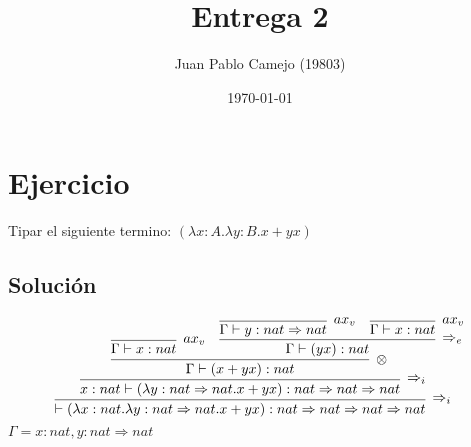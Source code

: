 \documentclass[a4paper,10pt]{article} %
\title{Entrega 2}
\author{Juan Pablo Camejo (19803)}
\date{\today}  %
\begin{document}
\maketitle   %

\section*{Ejercicio}
Tipar el siguiente termino: $(\lambda x:A.\lambda y:B .x+yx)$\\


\subsection*{Solución}
$$
\infer[\Rightarrow_i]{\vdash (\lambda x:nat .\lambda y:nat\Rightarrow nat .x+yx) :nat \Rightarrow nat \Rightarrow nat\Rightarrow nat}{
\infer[\Rightarrow_i]{  x:nat \vdash (\lambda y:nat\Rightarrow nat.x + y x) : nat \Rightarrow nat \Rightarrow nat }{
\infer[\otimes]{\Gamma \vdash  (x + y x) : nat}{
    \infer[ax_v]{\Gamma\vdash x:nat}{} & \infer[\Rightarrow_e]{\Gamma \vdash (yx):nat}{ 
        \infer[ax_v]{\Gamma \vdash y :nat \Rightarrow nat}{} &  \infer[ax_v]{\Gamma \vdash x:nat}{} }
                     }
                      }}
$$
$\Gamma = x:nat,y:nat\Rightarrow nat$
\end{document}
